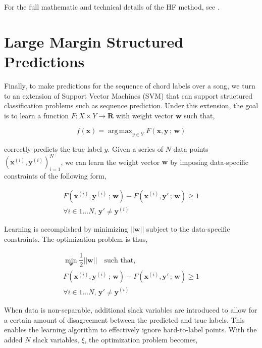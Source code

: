 \documentclass{article}
\DeclareMathOperator*{\argmax}{arg\,max}
\begin{document}
For the full mathematic and technical details of the HF method, see
\cite{martens2012training}.

\section{Large Margin Structured Predictions}
\label{sec:svms}

Finally, to make predictions for the sequence of chord labels over a song,
we turn to an extension of Support Vector Machines (SVM) that can support
structured classification problems such as sequence prediction. Under this
extension, the goal is to learn a function $F : X \times Y \rightarrow
\mathbf{R}$ with weight vector $\mathbf{w}$ such that,

\begin{equation*}
f(\mathbf{x}) = \argmax_{y \in Y}F(\mathbf{x},\mathbf{y}\,;\,\mathbf{w})
\end{equation*}

correctly predicts the true label $y$. Given a series of $N$ data points
$(\mathbf{x}^{(i)}, \mathbf{y}^{(i)})_{i=1}^{N}$, we can learn the weight
vector $\mathbf{w}$ by imposing data-specific constraints of the following
form,

\begin{equation*}
\begin{split}
F(\mathbf{x}^{(i)}, \mathbf{y}^{(i)}\,;\,\mathbf{w}) -
F(\mathbf{x}^{(i)}, \mathbf{y}'\,;\,\mathbf{w}) \geq 1 \\
\forall i \in 1\dots N,\,\mathbf{y}' \neq \mathbf{y}^{(i)}
\end{split}
\end{equation*}

Learning is accomplished by minimizing $||\mathbf{w}||$ subject to the
data-specific constraints. The optimization problem is thus,

\[
\begin{split}
\min_{\mathbf{w}}\dfrac{1}{2}||\mathbf{w}||\quad\text{such that,} \\
F(\mathbf{x}^{(i)}, \mathbf{y}^{(i)}\,;\,\mathbf{w}) -
F(\mathbf{x}^{(i)}, \mathbf{y}'\,;\,\mathbf{w}) \geq 1 \\
\forall i \in 1\dots N, \,\mathbf{y}' \neq \mathbf{y}^{(i)}
\end{split}
\]

When data is non-separable, additional slack variables are introduced to allow
for a certain amount of disagreement between the predicted and true labels.
  This enables the learning algorithm to effectively ignore hard-to-label
  points. With the added $N$ slack variables, $\xi$, the optimization problem
  becomes,
\end{document}
